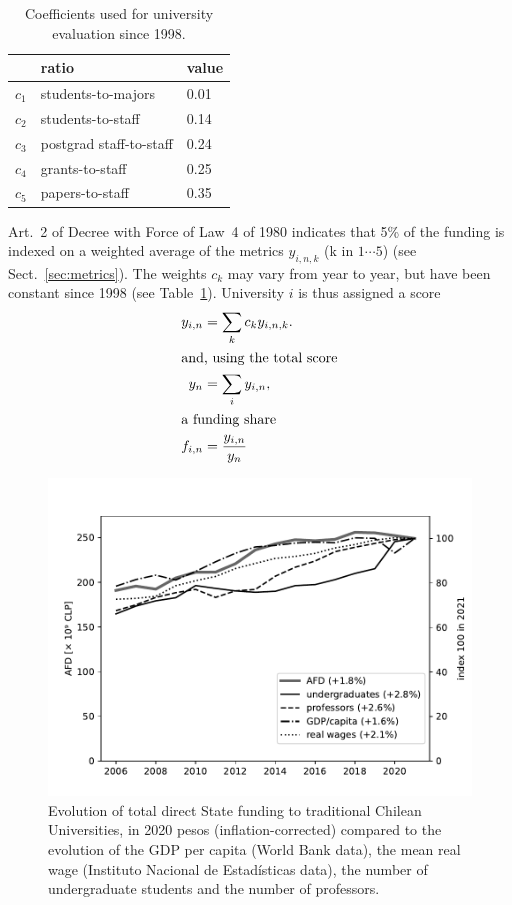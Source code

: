 \documentclass[twocolumn]{article}
\begin{document}
\begin{table}[t]
\centering
\caption{Coefficients used for university evaluation since 1998.}
\label{tab:coeff}
\begin{tabular}{lll}
\hline\hline
      & ratio                   & value\\
\hline
$c_1$ & students-to-majors      & 0.01\\
$c_2$ & students-to-staff       & 0.14\\
$c_3$ & postgrad staff-to-staff & 0.24\\
$c_4$ & grants-to-staff         & 0.25\\
$c_5$ & papers-to-staff         & 0.35\\
\hline
\end{tabular}
\end{table}


Art.~2 of Decree with Force of Law~4 of 1980 indicates that 5\% of the funding
is indexed on a weighted average of the metrics $y_{i,n,k}$ (k in $1\cdots5$)
(see Sect.~\ref{sec:metrics}). The weights $c_k$ may vary from year to year,
but have been constant since 1998 (see Table~\ref{tab:coeff}).  University $i$
is thus assigned a score
\begin{subequations}
\begin{align}
    y_{i,n}    &= \sum_k c_k y_{i,n,k}. \label{eq:y}\\
\intertext{and, using the total score}
    y_{n}      &= \sum_i y_{i,n},\\
\intertext{a funding share}
    f_{i,n}    &= \frac{y_{i,n}}{y_{n}} \label{eq:f}
\end{align}
\end{subequations}


\begin{figure}[t]
\centering
\includegraphics[width=\linewidth]{pdf/total-afd-timeseries.pdf}
\caption{Evolution of total direct State funding to traditional Chilean Universities, in 2020 pesos (inflation-corrected) compared to the evolution of the GDP per capita (World Bank data), the mean real wage (Instituto Nacional de Estadísticas data), the number of undergraduate students and the number of professors.}
\label{fig:total-afd}
\end{figure}
\end{document}
